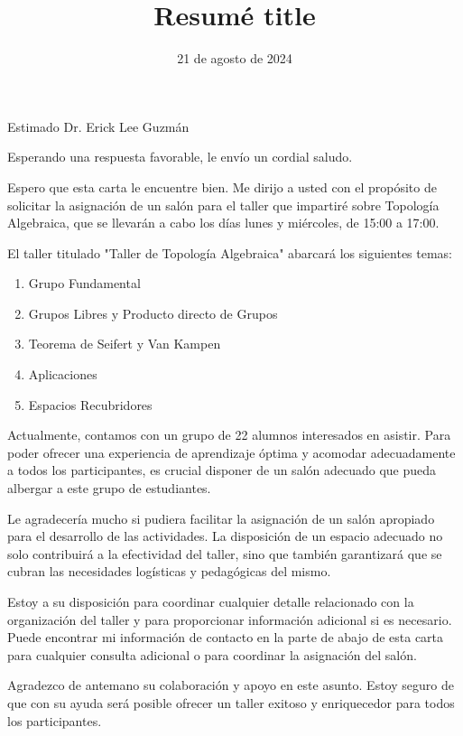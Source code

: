 \documentclass[11pt,a4paper,sans]{moderncv}        %
\title{Resumé title}                               %
\begin{document}
\date{21 de agosto de 2024}
\opening{Estimado Dr. Erick Lee Guzmán}
\closing{Esperando una respuesta favorable, le envío un cordial saludo.}

\makelettertitle

Espero que esta carta le encuentre bien. Me dirijo a usted con el propósito de solicitar la asignación de un salón para el taller que impartiré sobre Topología Algebraica, que se llevarán a cabo los días lunes y miércoles, de 15:00 a 17:00.

El taller titulado "Taller de Topología Algebraica" abarcará los siguientes temas:

\begin{enumerate}
    \item Grupo Fundamental
    \item Grupos Libres y Producto directo de Grupos
    \item Teorema de Seifert y Van Kampen
    \item Aplicaciones
    \item Espacios Recubridores
\end{enumerate}

Actualmente, contamos con un grupo de 22 alumnos interesados en asistir. Para poder ofrecer una experiencia de aprendizaje óptima y acomodar adecuadamente a todos los participantes, es crucial disponer de un salón adecuado que pueda albergar a este grupo de estudiantes.

Le agradecería mucho si pudiera facilitar la asignación de un salón apropiado para el desarrollo de las actividades. La disposición de un espacio adecuado no solo contribuirá a la efectividad del taller, sino que también garantizará que se cubran las necesidades logísticas y pedagógicas del mismo.

Estoy a su disposición para coordinar cualquier detalle relacionado con la organización del taller y para proporcionar información adicional si es necesario. Puede encontrar mi información de contacto en la parte de abajo de esta carta para cualquier consulta adicional o para coordinar la asignación del salón.

Agradezco de antemano su colaboración y apoyo en este asunto. Estoy seguro de que con su ayuda será posible ofrecer un taller exitoso y enriquecedor para todos los participantes.

\makeletterclosing
\end{document}
